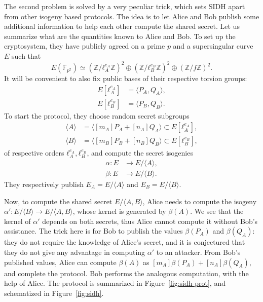 \documentclass[10pt]{article}
\theoremstyle{plain}
\theoremstyle{definition}
\def\F{\ensuremath{\mathbb{F}}}
\begin{document}
The second problem is solved by a very peculiar trick, which sets SIDH
apart from other isogeny based protocols. %
The idea is to let Alice and Bob publish some additional information
to help each other compute the shared secret. %
Let us summarize what are the quantities known to Alice and Bob. %
To set up the cryptosystem, they have publicly agreed on a prime $p$
and a supersingular curve $E$ such that
\[E(\F_{p^2}) ≃ (ℤ/ℓ_A^{e_A}ℤ)^2⊕(ℤ/ℓ_B^{e_B}ℤ)^2⊕(ℤ/fℤ)^2.\] %
It will be convenient to also fix public bases of their respective
torsion groups:
\begin{align*}
  E[ℓ_A^{e_A}] &= 〈P_A,Q_A〉,\\
  E[ℓ_B^{e_B}] &= 〈P_B,Q_B〉.
\end{align*}
To start the protocol, they choose random secret subgroups
\begin{align*}
  〈A〉 &= 〈[m_A]P_A+[n_A]Q_A〉 ⊂ E[ℓ_A^{e_A}],\\  
  〈B〉 &= 〈[m_B]P_B+[n_B]Q_B〉 ⊂ E[ℓ_B^{e_B}],
\end{align*}
of respective orders $ℓ_A^{e_A},ℓ_B^{e_B}$, and compute the secret
isogenies
\begin{align*}
  α : E &\to E/〈Α〉,\\
  β : E &\to E/〈B〉.
\end{align*}
They respectively publish $E_A=E/〈Α〉$ and $E_B=E/〈B〉$. %

Now, to compute the shared secret $E/〈A,B〉$, Alice needs to compute
the isogeny $α':E/〈B〉\to E/〈A,B〉$, whose kernel is generated by
$β(A)$. %
We see that the kernel of $α'$ depends on both secrets, thus Alice
cannot compute it without Bob's assistance. %
The trick here is for Bob to publish the values $β(P_A)$ and $β(Q_A)$:
they do not require the knowledge of Alice's secret, and it is
conjectured that they do not give any advantage in computing $α'$ to
an attacker. %
From Bob's published values, Alice can compute $β(A)$ as
$[m_A]β(P_A) + [n_A]β(Q_A)$, and complete the protocol. %
Bob performs the analogous computation, with the help of Alice. %
The protocol is summarized in Figure~\ref{fig:sidh-prot}, and
schematized in Figure~\ref{fig:sidh}.
\end{document}
